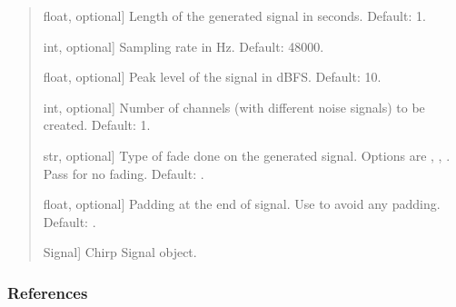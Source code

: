 \documentclass[letterpaper,10pt,english]{sphinxmanual}
\begin{document}
\begin{fulllineitems}
\begin{quote}
\begin{description}
\begin{description}
\sphinxlineitem{\sphinxstylestrong{length\_seconds}}{[}float, optional{]}
\sphinxAtStartPar
Length of the generated signal in seconds. Default: 1.

\sphinxlineitem{\sphinxstylestrong{sampling\_rate\_hz}}{[}int, optional{]}
\sphinxAtStartPar
Sampling rate in Hz. Default: 48000.

\sphinxlineitem{\sphinxstylestrong{peak\_level\_dbfs}}{[}float, optional{]}
\sphinxAtStartPar
Peak level of the signal in dBFS. Default: \sphinxhyphen{}10.

\sphinxlineitem{\sphinxstylestrong{number\_of\_channels}}{[}int, optional{]}
\sphinxAtStartPar
Number of channels (with different noise signals) to be created.
Default: 1.

\sphinxlineitem{\sphinxstylestrong{fade}}{[}str, optional{]}
\sphinxAtStartPar
Type of fade done on the generated signal. Options are ,
, . Pass  for no fading. Default: .

\sphinxlineitem{\sphinxstylestrong{padding\_end\_seconds}}{[}float, optional{]}
\sphinxAtStartPar
Padding at the end of signal. Use  to avoid any padding.
Default: .

\end{description}

\begin{description}
\sphinxlineitem{\sphinxstylestrong{chirp\_sig}}{[}Signal{]}
\sphinxAtStartPar
Chirp Signal object.

\end{description}

\end{description}\end{quote}
\subsubsection*{References}

\sphinxAtStartPar
{}

\end{fulllineitems}

\end{document}
